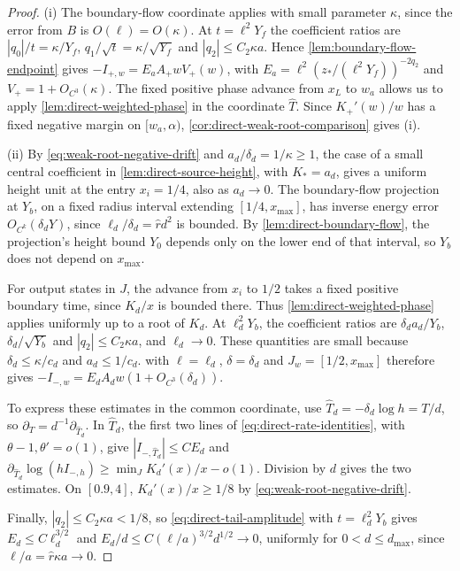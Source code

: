 \begin{proof}
(i) The boundary-flow coordinate applies with small parameter
\(\kappa\), since the error from \(B\) is \(O(\ell)=O(\kappa)\). At
\(t=\ell^2Y_f\) the coefficient ratios are \(|q_0|/t=\kappa/Y_f\),
\(q_1/\sqrt t=\kappa/\sqrt{Y_f}\) and \(|q_2|\le C_2\kappa a\). Hence
\cref{lem:boundary-flow-endpoint} gives
\(-I_{+,w}=E_aA_+wV_+(w)\), with
\(E_a=\ell^2(z_*/(\ell^2Y_f))^{-2q_2}\) and
\(V_+=1+O_{C^3}(\kappa)\). The fixed positive phase advance from
\(x_L\) to \(w_a\) allows us to apply
\cref{lem:direct-weighted-phase} in the coordinate \(\widehat T\).
Since \(K_+'(w)/w\) has a fixed negative margin on
\([w_a,\alpha)\), \cref{cor:direct-weak-root-comparison} gives (i).

(ii) By \eqref{eq:weak-root-negative-drift} and \(a_d/\delta_d=1/\kappa\ge1\),
the case of a small central coefficient in \cref{lem:direct-source-height},
with \(K_*=a_d\), gives a uniform height unit at the entry \(x_i=1/4\),
also as \(a_d\to0\).
The boundary-flow projection at \(Y_b\), on a fixed radius interval
extending \([1/4,x_{\max}]\), has inverse energy error
\(O_{C^k}(\delta_dY)\), since \(\ell_d/\delta_d=\hat rd^2\) is bounded.
By \cref{lem:direct-boundary-flow}, the projection's height bound \(Y_0\) depends
only on the lower end of that interval, so \(Y_b\) does not depend on
\(x_{\max}\).

For output states in \(J\), the advance from \(x_i\) to \(1/2\)
takes a fixed positive boundary time, since \(K_d/x\) is bounded
there. Thus \cref{lem:direct-weighted-phase} applies uniformly up to
a root of \(K_d\). At \(\ell_d^2Y_b\), the coefficient ratios are
\(\delta_da_d/Y_b\), \(\delta_d/\sqrt{Y_b}\) and
\(|q_2|\le C_2\kappa a\), and \(\ell_d\to0\).
These quantities are small because \(\delta_d\le\kappa/c_d\)
and \(a_d\le1/c_d\).  with
\(\ell=\ell_d\), \(\delta=\delta_d\) and \(J_w=[1/2,x_{\max}]\)
therefore gives \(-I_{-,w}=E_dA_dw(1+O_{C^3}(\delta_d))\).

To express these estimates in the common coordinate, use
\(\widehat T_d=-\delta_d\log h=T/d\), so
\(\partial_T=d^{-1}\partial_{\widehat T_d}\). In \(\widehat T_d\),
the first two lines of \eqref{eq:direct-rate-identities}, with
\(\theta-1,\theta'=o(1)\), give \(|I_{-,\widehat T_d}|\le CE_d\) and
\(\partial_{\widehat T_d}\log(hI_{-,h})\ge\min_JK_d'(x)/x-o(1)\).
Division by \(d\) gives the two estimates. On \([0.9,4]\),
\(K_d'(x)/x\ge1/8\) by \eqref{eq:weak-root-negative-drift}.

Finally, \(|q_2|\le C_2\kappa a<1/8\), so
\eqref{eq:direct-tail-amplitude} with \(t=\ell_d^2Y_b\) gives
\(E_d\le C\ell_d^{3/2}\) and
\(E_d/d\le C(\ell/a)^{3/2}d^{1/2}\to0\), uniformly for
\(0<d\le d_{\max}\), since \(\ell/a=\hat r\kappa a\to0\).


\end{proof}
